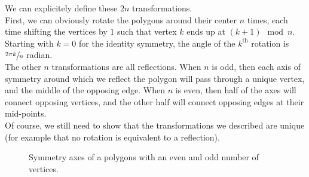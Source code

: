 \documentclass[12pt]{article}
\begin{document}
    We can explicitely define these $2n$ transformations. \\
    First, we can obviously rotate the polygons
    around their center $n$ times,
    each time shifting the vertices by $1$
    such that vertex $k$ ends up at $(k + 1)\mod n$.
    Starting with $k = 0$ for the identity symmetry,
    the angle of the $k^{\text{th}}$ rotation
    is $\sfrac{2\pi k}{n}$ radian. \\
    The other $n$ transformations are all reflections.
    When $n$ is odd,
    then each axis of symmetry around which we reflect the polygon
    will pass through a unique vertex,
    and the middle of the opposing edge.
    When $n$ is even,
    then half of the axes will connect opposing vertices,
    and the other half will connect opposing edges at their mid-points. \\
    Of course, we still need to show that the transformations
    we described are unique
    (for example that no rotation is equivalent to a reflection). \\
    \begin{figure}[H]
        \centering

        \caption{\label{fig:figure1} Symmetry axes
        of a polygons with an even and odd number of vertices.}
    \end{figure}
\end{document}
